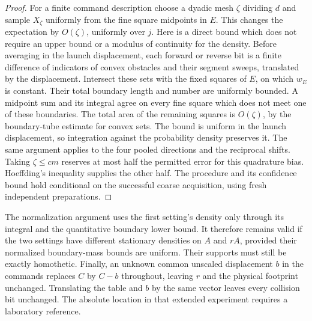 \begin{proof}
For a finite command description choose a dyadic mesh $\zeta$ dividing
$d$ and sample $X_\zeta$ uniformly from the fine square midpoints in
$E$. This changes the expectation by $O(\zeta)$, uniformly over $j$.
Here is a direct bound which does not require an upper bound or a
modulus of continuity for the density. Before averaging in the
launch displacement, each forward or reverse bit is a finite
difference of indicators of convex obstacles and their segment
sweeps, translated by the displacement. Intersect these sets with
the fixed squares of $E$, on which $w_E$ is constant. Their total
boundary length and number are uniformly bounded. A midpoint sum
and its integral agree on every fine square which does not meet
one of these boundaries. The total area of the remaining squares is
$O(\zeta)$, by the boundary-tube estimate for convex sets. The bound
is uniform in the launch displacement, so integration against the
probability density preserves it. The same argument applies to the
four pooled directions and the reciprocal shifts. Taking
$\zeta\le c m$ reserves at most half the permitted error for this
quadrature bias. Hoeffding's inequality supplies the other half.
The procedure and its confidence bound hold conditional on the
successful coarse acquisition, using fresh independent preparations.
\end{proof}

The normalization argument uses the first setting's density only
through its integral and the quantitative boundary lower bound.
It therefore remains valid if the two settings have different
stationary densities on $A$ and $rA$, provided their normalized
boundary-mass bounds are uniform. Their supports must still be
exactly homothetic. Finally, an unknown common unscaled displacement
$b$ in the commands replaces $C$ by $C-b$ throughout, leaving $r$
and the physical footprint unchanged. Translating the table and
$b$ by the same vector leaves every collision bit unchanged. The
absolute location in that extended experiment requires a laboratory
reference.

